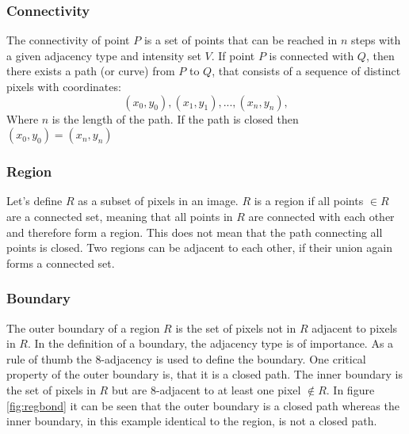 \subsubsection{Connectivity}
The connectivity of point $P$ is a set of points that can be reached in $n$ steps with a given adjacency type and intensity set $V$. If point $P$ is connected with $Q$, then there exists a path (or curve) from $P$ to $Q$, that consists of a sequence of distinct pixels with coordinates:
\begin{equation*}
    (x_0,y_0),(x_1,y_1),...,(x_n,y_n), 
\end{equation*}
Where $n$ is the length of the path. If the path is closed then $(x_0,y_0) = (x_n,y_n)$
\subsubsection{Region}
Let's define $R$ as a subset of pixels in an image. $R$ is a region if all points $\in R$ are a connected set, meaning that all points in $R$ are connected with each other and therefore form a region. This does not mean that the path connecting all points is closed. Two regions can be adjacent to each other, if their union again forms a connected set. 

\subsubsection{Boundary}
The outer boundary of a region $R$ is the set of pixels not in $R$ adjacent to pixels in $R$. In the definition of a boundary, the adjacency type is of importance. As a rule of thumb the 8-adjacency is used to define the boundary. One critical property of the outer boundary is, that it is a closed path. The inner boundary is the set of pixels in $R$ but are 8-adjacent to at least one pixel $\notin  R$. In figure \ref{fig:regbond} it can be seen that the outer boundary is a closed path whereas the inner boundary, in this example identical to the region, is not a closed path.

